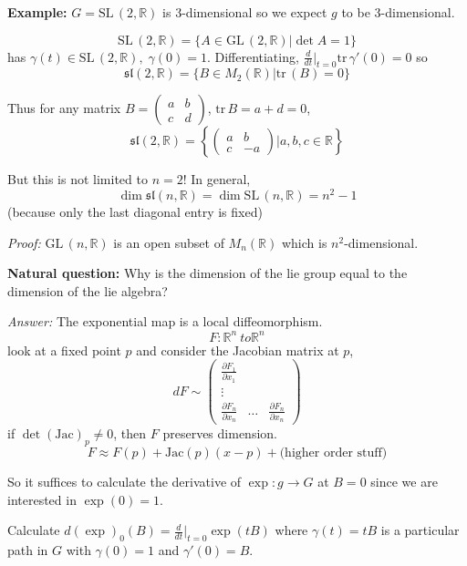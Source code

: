 \documentclass[12pt]{article}
\newcommand{\R}{\mathbb{R}}
\newcommand{\SL}{\text{SL}\,}
\newcommand{\GL}{\text{GL}\,}
\newcommand{\tr}{\text{tr}\,}
\newcommand{\slf}{\mathfrak{sl}}
\newenvironment*{tbox}[2][gray]{
    \begin{tcolorbox}[
        parbox=false,
        colback=#1!5!white,
        colframe=#1!75!black,
        breakable,
        title={#2}
    ]}
    {\end{tcolorbox}}
\begin{document}
    \textbf{Example:} $G = \SL(2, \R)$ is 3-dimensional so we expect $g$ to be 3-dimensional. 

    \[\SL(2, \R) = \{A \in \GL(2, \R) \big\vert \det A = 1\}\] 
    has $\gamma(t) \in \SL(2, \R), \; \gamma(0) = 1$. Differentiating, $\frac{d}{dt}\bigg\vert_{t=0} \tr \gamma'(0) = 0$ so 
    \[\slf(2, \R) = \{B \in M_2(\R)\big\vert \tr(B) = 0\}\]

    Thus for any matrix $B = \begin{pmatrix}
        a & b\\ 
        c & d
    \end{pmatrix}$, $\tr B = a + d = 0$, 
    \[\slf(2, \R) = \left\{\begin{pmatrix}
        a & b\\ 
        c & -a
    \end{pmatrix} \bigg\vert a, b, c \in \R\right\}\]  

    But this is not limited to $n=2$! In general, 
    \[\dim \slf(n, \R) = \dim \SL(n, \R) = n^2 - 1\]
    (because only the last diagonal entry is fixed)

    \begin{tbox}{ \emph{Claim:} $\dim \GL(n, \R) = n^2$}
        \emph{Proof:} $\GL(n, \R)$ is an open subset of $M_n(\R)$ which is $n^2$-dimensional.
    \end{tbox}

    \textbf{Natural question:} Why is the dimension of the lie group equal to the dimension of the lie algebra?
    
    \emph{Answer:} The exponential map is a local diffeomorphism. 
    \[F: \R^n\ to \R^n\]
    look at a fixed point $p$ and consider the Jacobian matrix at $p$, 
    \[dF \sim \begin{pmatrix}
        \frac{\partial F_1}{\partial x_1}\\ 
        \vdots\\
        \frac{\partial F_n}{\partial x_n} & \dots & \frac{\partial F_n}{\partial x_n}
    \end{pmatrix}\] 
    if $\det(\text{Jac})_p \neq 0$, then $F$ preserves dimension. 
    \[F \approx F(p) + \text{Jac}(p)(x - p) + \text{(higher order stuff)}\]

    So it suffices to calculate the derivative of $\exp: g \to G$ at $B = 0$ since we are interested in $\exp(0) = 1$.

    Calculate $d(\exp)_0(B) = \frac{d}{dt}\bigg\vert_{t=0} \exp(tB)$ where $\gamma(t) = tB$ is a particular path in $G$ with $\gamma(0) = 1$ and $\gamma'(0) = B$. 
\end{document}
